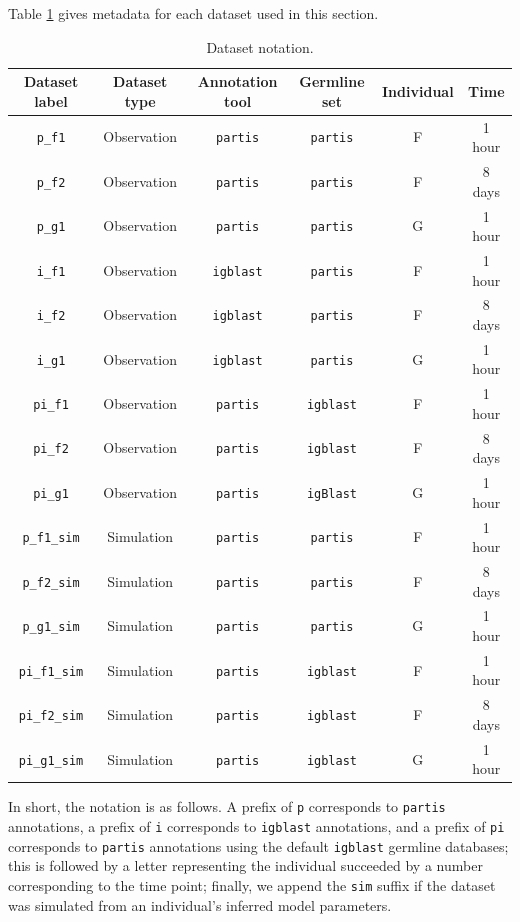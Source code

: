 \documentclass{article}
\begin{document}
Table \ref{tab:Datasets} gives metadata for each dataset used in this section.
\begin{table}
\begin{tabular}{c|c|c|c|c|c}
	Dataset label & Dataset type & Annotation tool & Germline set & Individual & Time \\
	\hline
    \texttt{p\_f1} & Observation &     \texttt{partis} & \texttt{partis} & F & 1 hour \\
    \texttt{p\_f2} & Observation &     \texttt{partis} & \texttt{partis} & F & 8 days \\
    \texttt{p\_g1} & Observation &     \texttt{partis} & \texttt{partis} & G & 1 hour \\
    \texttt{i\_f1} & Observation &     \texttt{igblast} & \texttt{partis} & F & 1 hour \\
    \texttt{i\_f2} & Observation &     \texttt{igblast} & \texttt{partis} & F & 8 days \\
    \texttt{i\_g1} & Observation &     \texttt{igblast} & \texttt{partis} & G & 1 hour\\
    \texttt{pi\_f1} & Observation &    \texttt{partis} & \texttt{igblast} & F & 1 hour\\
    \texttt{pi\_f2} & Observation &    \texttt{partis} & \texttt{igblast} & F & 8 days\\
    \texttt{pi\_g1} & Observation &    \texttt{partis} & \texttt{igBlast} & G & 1 hour\\
    \texttt{p\_f1\_sim} & Simulation & \texttt{partis} & \texttt{partis} & F & 1 hour\\
    \texttt{p\_f2\_sim} & Simulation & \texttt{partis} & \texttt{partis} & F & 8 days\\
    \texttt{p\_g1\_sim} & Simulation & \texttt{partis} & \texttt{partis} & G & 1 hour\\
    \texttt{pi\_f1\_sim} & Simulation& \texttt{partis} & \texttt{igblast} & F & 1 hour\\
    \texttt{pi\_f2\_sim} & Simulation& \texttt{partis} & \texttt{igblast} & F & 8 days\\
    \texttt{pi\_g1\_sim} & Simulation& \texttt{partis} & \texttt{igblast} & G & 1 hour\\
\end{tabular}
\caption{Dataset notation.}
\label{tab:Datasets}
\end{table}
In short, the notation is as follows.
A prefix of \texttt{p} corresponds to \texttt{partis} annotations, a prefix of \texttt{i} corresponds to \texttt{igblast} annotations, and a prefix of \texttt{pi} corresponds to \texttt{partis} annotations using the default \texttt{igblast} germline databases;
this is followed by a letter representing the individual succeeded by a number corresponding to the time point;
finally, we append the \texttt{sim} suffix if the dataset was simulated from an individual's inferred model parameters.
\end{document}
